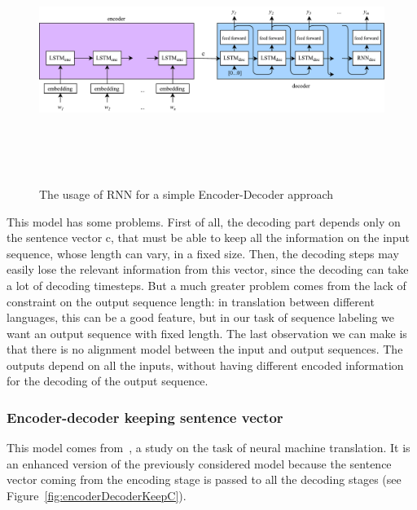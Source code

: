 
\begin{figure}[!htbp]
    \centering
    \includegraphics[max width=\linewidth,max height=8cm,keepaspectratio]{figures/encoderDecoderRNN}
    \caption{The usage of RNN for a simple Encoder-Decoder approach}\label{fig:encoderDecoderRNN}
\end{figure}

This model has some problems. First of all, the decoding part depends only on the sentence vector c, that must be able to keep all the information on the input sequence, whose length can vary, in a fixed size. Then, the decoding steps may easily lose the relevant information from this vector, since the decoding can take a lot of decoding timesteps. But a much greater problem comes from the lack of constraint on the output sequence length: in translation between different languages, this can be a good feature, but in our task of sequence labeling we want an output sequence with fixed length. The last observation we can make is that there is no alignment model between the input and output sequences. The outputs depend on all the inputs, without having different encoded information for the decoding of the output sequence.

\subsubsection{Encoder-decoder keeping sentence vector}
This model comes from~\cite{cho2014learning}, a study on the task of neural machine translation. It is an enhanced version of the previously considered model because the sentence vector coming from the encoding stage is passed to all the decoding stages (see Figure~\ref{fig:encoderDecoderKeepC}).


